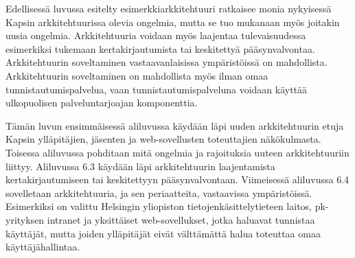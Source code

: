 Edellisessä luvussa esitelty esimerkkiarkkitehtuuri ratkaisee monia nykyisessä Kapsin arkkitehtuurissa olevia ongelmia, mutta se tuo mukanaan myös joitakin uusia ongelmia. Arkkitehtuuria voidaan myös laajentaa tulevaisuudessa esimerkiksi tukemaan kertakirjautumista tai keskitettyä pääsynvalvontaa. Arkkitehtuurin soveltaminen vastaavanlaisissa ympäristöissä on mahdollista. Arkkitehtuurin soveltaminen on mahdollista myös ilman omaa tunnistautumispalvelua, vaan tunnistautumispalveluna voidaan käyttää ulkopuolisen palveluntarjoajan komponenttia.

Tämän luvun ensimmäisessä aliluvussa käydään läpi uuden arkkitehtuurin etuja Kapsin ylläpitäjien, jäsenten ja web-sovellusten toteuttajien näkökulmasta. Toisessa aliluvussa pohditaan mitä ongelmia ja rajoituksia uuteen arkkitehtuuriin liittyy. Aliluvussa 6.3 käydään läpi arkkitehtuurin laajentamista kertakirjautumiseen tai keskitettyyn pääsynvalvontaan. Viimeisessä aliluvussa 6.4 sovelletaan arkkitehtuuria, ja sen periaatteita, vastaavissa ympäristöissä. Esimerkiksi on valittu Helsingin yliopiston tietojenkäsittelytieteen laitos, pk-yrityksen intranet ja yksittäiset web-sovellukset, jotka haluavat tunnistaa käyttäjät, mutta joiden ylläpitäjät eivät välttämättä halua toteuttaa omaa käyttäjähallintaa.